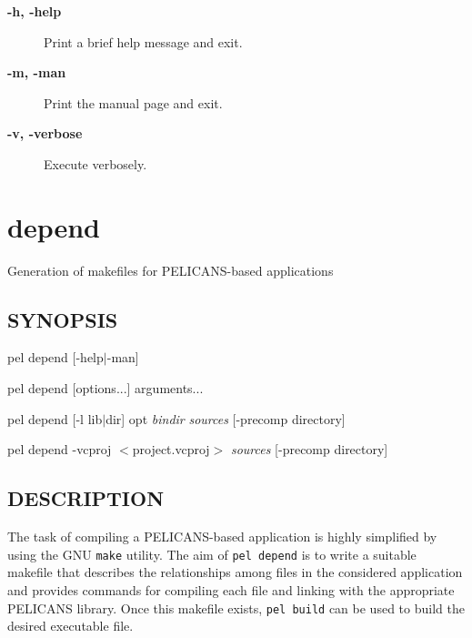 \documentclass{article}
\begin{document}
\begin{description}

\item[\textbf{-h, -help}] \mbox{}

Print a brief help message and exit.


\item[\textbf{-m, -man}] \mbox{}

Print the manual page and exit.


\item[\textbf{-v, -verbose}] \mbox{}

Execute verbosely.

\end{description}
\clearpage
\section{depend\label{depend}}


Generation of makefiles for PELICANS-based applications

\subsection*{SYNOPSIS\label{depend_SYNOPSIS}}


pel depend [-help$|$-man]



pel depend [options...] arguments...



pel depend [-l lib$|$dir] opt \emph{bindir} \emph{sources} [-precomp directory]



pel depend -vcproj $<$project.vcproj$>$ \emph{sources} [-precomp directory]

\subsection*{DESCRIPTION\label{depend_DESCRIPTION}}


The task of compiling a PELICANS-based application is highly
simplified by using the GNU \texttt{make} utility. The aim
of \texttt{pel depend} is to write a suitable makefile
that describes the relationships among
files in the considered application and provides
commands for compiling each file and linking with the appropriate
PELICANS library. Once this makefile exists, \texttt{pel build}
can be used to build the desired executable file.
\end{document}
